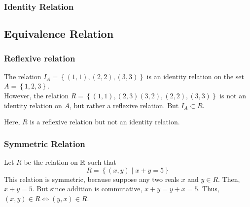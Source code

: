 
\subsubsection{Identity Relation}


\subsection{Equivalence Relation}

\subsubsection{Reflexive relation}




\begin{example}
    \label{ex: identity}
    The relation \(I_A = \left\{(1,1), (2,2), (3,3)\right\}\) is an identity relation on the set
    \(A = \left\{1,2,3\right\}\). \\
    However, the relation \(R = \left\{(1,1), (2,3)(3,2), (2,2), (3,3)\right\}\)
    is not an identity relation on \(A\), but rather a reflexive relation. But \(I_A \subset R\).\par
    Here, \(R\) is a reflexive relation but not an identity relation.
\end{example}

\subsubsection{Symmetric Relation}


\begin{example}
    Let \(R\) be the relation on \(\mathbb R\) such that \[
        R = \left\{(x,y) \mid x + y = 5\right\}
    \]
    This relation is symmetric, because suppose any two reals \(x\) and \(y \in R\). Then,
    \(x + y = 5\). But since addition is commutative, \(x + y = y + x = 5\). 
    Thus, \((x,y) \in R \iff (y,x) \in R\).
\end{example}

